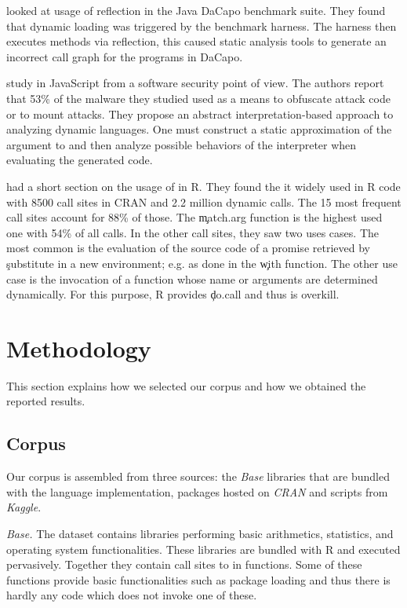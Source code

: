 \documentclass[review,screen,acmsmall,anonymous=true]{acmart}
\newcommand{\mypara}[1]{\medskip\noindent\emph{#1}\xspace}
\begin{document}
\citet{bodden} looked at usage of reflection in the Java DaCapo benchmark suite.
They found that dynamic loading was triggered by the benchmark harness. The
harness then executes methods via reflection, this caused static analysis tools
to generate an incorrect call graph for the programs in DaCapo.

\citet{Arceri21} study \eval in JavaScript from a software security point of
view. The authors report that 53\% of the malware they studied used \eval as a
means to obfuscate attack code or to mount attacks. They propose an abstract
interpretation-based approach to analyzing dynamic languages. One must construct
a static approximation of the argument to \eval and then analyze possible
behaviors of the interpreter when evaluating the generated code.

\citet{ecoop12} had a short section on the usage of \eval in R. They found the
it widely used in R code with 8500 call sites in CRAN and 2.2 million dynamic
calls. The 15 most frequent call sites account for 88\% of those. The
\c{match.arg} function is the highest used one with 54\% of all calls. In the
other call sites, they saw two uses cases. The most common is the evaluation of
the source code of a promise retrieved by \c{substitute} in a new environment;
e.g. as done in the \c{with} function. The other use case is the invocation of a
function whose name or arguments are determined dynamically. For this purpose, R
provides \c{do.call} and thus \eval is overkill.


\section{Methodology}

This section explains how we selected our corpus and how we obtained the
reported results.

\subsection{Corpus}

Our corpus is assembled from three sources: the \emph{Base} libraries that are
bundled with the language implementation, packages hosted on \emph{CRAN} and
scripts from \emph{Kaggle}.

\mypara{Base.} The dataset contains \BasePackages libraries performing basic
arithmetics, statistics, and operating system functionalities. These libraries
are bundled with R and executed pervasively. Together they contain
\BaseEvalCallSites call sites to \eval in \BaseFunsWithEvals functions. Some of these
functions provide basic functionalities such as package loading and thus there
is hardly any code which does not invoke one of these.
\end{document}
